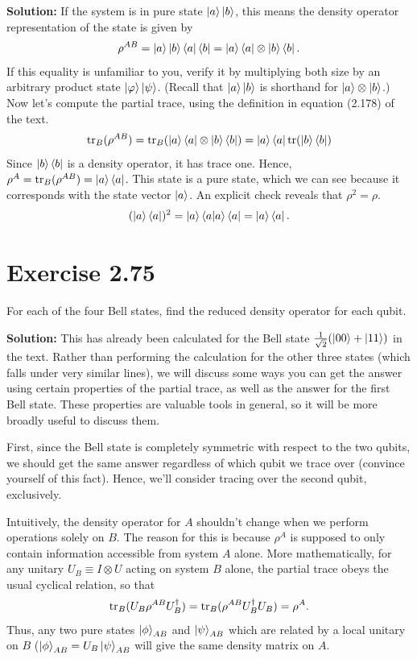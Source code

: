 \documentclass{book}
\begin{document}
    \textbf{Solution:} If the system is in pure state $\ket{a}\ket{b}$, this means the density operator representation of the state is given by
    \begin{align}
        \rho^{AB} = \ket{a}\ket{b}\bra{a}\bra{b} = \ket{a}\bra{a}\otimes \ket{b}\bra{b}.
    \end{align}
    If this equality is unfamiliar to you, verify it by multiplying both size by an arbitrary product state $\ket{\varphi} \ket{\psi}$. (Recall that $\ket{a}\ket{b}$ is shorthand for $\ket{a}\otimes \ket{b}$.) Now let's compute the partial trace, using the definition in equation (2.178) of the text.
    \begin{align}
        \tr_B(\rho^{AB}) = \tr_B(\ket{a}\bra{a}\otimes \ket{b}\bra{b}) = \ket{a}\bra{a} \tr(\ket{b}\bra{b})
    \end{align}
    Since $\ket{b}\bra{b}$ is a density operator, it has trace one. Hence, $\rho^A = \tr_B(\rho^{AB}) = \ket{a}\bra{a}$. This state is a pure state, which we can see because it corresponds with the state vector $\ket{a}$. An explicit check reveals that $\rho^2 = \rho$.
    \begin{align}
        (\ket{a}\bra{a})^2 = \ket{a}\bra{a}\ket{a}\bra{a} = \ket{a}\bra{a}.
    \end{align}

\section*{Exercise 2.75}
    For each of the four Bell states, find the reduced density operator for each qubit.

    \textbf{Solution:} This has already been calculated for the Bell state $\frac{1}{\sqrt{2}}(\ket{00}+\ket{11})$ in the text. Rather than performing the calculation for the other three states (which falls under very similar lines), we will discuss some ways you can get the answer using certain properties of the partial trace, as well as the answer for the first Bell state. These properties are valuable tools in general, so it will be more broadly useful to discuss them.

    First, since the Bell state is completely symmetric with respect to the two qubits, we should get the same answer regardless of which qubit we trace over (convince yourself of this fact). Hence, we'll consider tracing over the second qubit, exclusively. 

    Intuitively, the density operator for $A$ shouldn't change when we perform operations solely on $B$. The reason for this is because $\rho^A$ is supposed to only contain information accessible from system $A$ alone. More mathematically, for any unitary $U_B \equiv I \otimes U$ acting on system $B$ alone, the partial trace obeys the usual cyclical relation, so that
    \begin{align}
        \tr_B(U_B \rho^{AB} U_B^\dagger) = \tr_B(\rho^{AB} U_B^\dagger U_B) = \rho^A.
    \end{align}
    Thus, any two pure states $\ket{\phi}_{AB}$ and $\ket{\psi}_{AB}$ which are related by a local unitary on $B$ ($\ket{\phi}_{AB} = U_B \ket{\psi}_{AB}$ will give the same density matrix on $A$.
\end{document}
